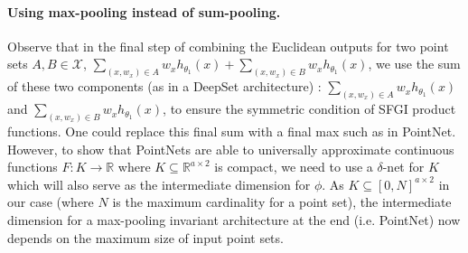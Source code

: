 \documentclass[12pt]{article}
\newcommand{\R}{\mathbb R}
\newcommand{\SFGI} {{SFGI}}
\begin{document}
\paragraph{Using max-pooling instead of sum-pooling.} Observe that in the final step of combining the Euclidean outputs for two point sets $A, B \in \mathcal{X}$, $\sum_{(x, w_x)\in A}w_x h_{\theta_1}(x) + \sum_{(x, w_x) \in B}w_x h_{\theta_1}(x)$, we use the sum of these two components (as in a DeepSet architecture) : $\sum_{(x, w_x) \in A}w_x h_{\theta_1}(x)$ and $\sum_{(x, w_x) \in B}w_x h_{\theta_1}(x)$, to ensure the symmetric condition of \SFGI{} product functions. One could replace this final sum with a final max such as in PointNet. However, to show that PointNets are able to universally approximate continuous functions $F: K \to \R$ where $K \subseteq \R^{a \times 2}$ is compact, we need to use a $\delta$-net for $K$ which will also serve as the intermediate dimension for $\phi$. As $K \subseteq [0, N]^{a \times 2}$ in our case (where $N$ is the maximum cardinality for a point set), the intermediate dimension for a max-pooling invariant architecture at the end (i.e. PointNet) now depends on the maximum size of input point sets. 
\end{document}
